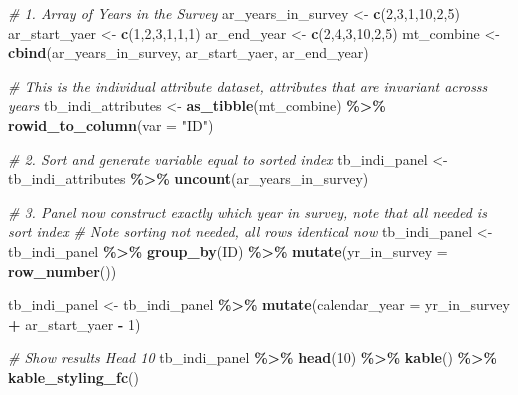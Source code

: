 \documentclass[
]{book}
\newenvironment{Shaded}{\begin{snugshade}}{\end{snugshade}}
\newcommand{\CommentTok}[1]{\textcolor[rgb]{0.56,0.35,0.01}{\textit{#1}}}
\newcommand{\DataTypeTok}[1]{\textcolor[rgb]{0.13,0.29,0.53}{#1}}
\newcommand{\DecValTok}[1]{\textcolor[rgb]{0.00,0.00,0.81}{#1}}
\newcommand{\KeywordTok}[1]{\textcolor[rgb]{0.13,0.29,0.53}{\textbf{#1}}}
\newcommand{\NormalTok}[1]{#1}
\newcommand{\OperatorTok}[1]{\textcolor[rgb]{0.81,0.36,0.00}{\textbf{#1}}}
\newcommand{\StringTok}[1]{\textcolor[rgb]{0.31,0.60,0.02}{#1}}
\begin{document}
\begin{Shaded}
\begin{Highlighting}[]
\CommentTok{\# 1. Array of Years in the Survey}
\NormalTok{ar\_years\_in\_survey \textless{}{-}}\StringTok{ }\KeywordTok{c}\NormalTok{(}\DecValTok{2}\NormalTok{,}\DecValTok{3}\NormalTok{,}\DecValTok{1}\NormalTok{,}\DecValTok{10}\NormalTok{,}\DecValTok{2}\NormalTok{,}\DecValTok{5}\NormalTok{)}
\NormalTok{ar\_start\_yaer \textless{}{-}}\StringTok{ }\KeywordTok{c}\NormalTok{(}\DecValTok{1}\NormalTok{,}\DecValTok{2}\NormalTok{,}\DecValTok{3}\NormalTok{,}\DecValTok{1}\NormalTok{,}\DecValTok{1}\NormalTok{,}\DecValTok{1}\NormalTok{)}
\NormalTok{ar\_end\_year \textless{}{-}}\StringTok{ }\KeywordTok{c}\NormalTok{(}\DecValTok{2}\NormalTok{,}\DecValTok{4}\NormalTok{,}\DecValTok{3}\NormalTok{,}\DecValTok{10}\NormalTok{,}\DecValTok{2}\NormalTok{,}\DecValTok{5}\NormalTok{)}
\NormalTok{mt\_combine \textless{}{-}}\StringTok{ }\KeywordTok{cbind}\NormalTok{(ar\_years\_in\_survey, ar\_start\_yaer, ar\_end\_year)}

\CommentTok{\# This is the individual attribute dataset, attributes that are invariant acrosss years}
\NormalTok{tb\_indi\_attributes \textless{}{-}}\StringTok{ }\KeywordTok{as\_tibble}\NormalTok{(mt\_combine) }\OperatorTok{\%\textgreater{}\%}\StringTok{ }\KeywordTok{rowid\_to\_column}\NormalTok{(}\DataTypeTok{var =} \StringTok{"ID"}\NormalTok{)}

\CommentTok{\# 2. Sort and generate variable equal to sorted index}
\NormalTok{tb\_indi\_panel \textless{}{-}}\StringTok{ }\NormalTok{tb\_indi\_attributes }\OperatorTok{\%\textgreater{}\%}\StringTok{ }\KeywordTok{uncount}\NormalTok{(ar\_years\_in\_survey)}

\CommentTok{\# 3. Panel now construct exactly which year in survey, note that all needed is sort index}
\CommentTok{\# Note sorting not needed, all rows identical now}
\NormalTok{tb\_indi\_panel \textless{}{-}}\StringTok{ }\NormalTok{tb\_indi\_panel }\OperatorTok{\%\textgreater{}\%}
\StringTok{                    }\KeywordTok{group\_by}\NormalTok{(ID) }\OperatorTok{\%\textgreater{}\%}
\StringTok{                    }\KeywordTok{mutate}\NormalTok{(}\DataTypeTok{yr\_in\_survey =} \KeywordTok{row\_number}\NormalTok{())}

\NormalTok{tb\_indi\_panel \textless{}{-}}\StringTok{ }\NormalTok{tb\_indi\_panel }\OperatorTok{\%\textgreater{}\%}
\StringTok{                    }\KeywordTok{mutate}\NormalTok{(}\DataTypeTok{calendar\_year =}\NormalTok{ yr\_in\_survey }\OperatorTok{+}\StringTok{ }\NormalTok{ar\_start\_yaer }\OperatorTok{{-}}\StringTok{ }\DecValTok{1}\NormalTok{)}

\CommentTok{\# Show results Head 10}
\NormalTok{tb\_indi\_panel }\OperatorTok{\%\textgreater{}\%}\StringTok{ }\KeywordTok{head}\NormalTok{(}\DecValTok{10}\NormalTok{) }\OperatorTok{\%\textgreater{}\%}
\StringTok{  }\KeywordTok{kable}\NormalTok{() }\OperatorTok{\%\textgreater{}\%}
\StringTok{  }\KeywordTok{kable\_styling\_fc}\NormalTok{()}
\end{Highlighting}
\end{Shaded}
\end{document}
